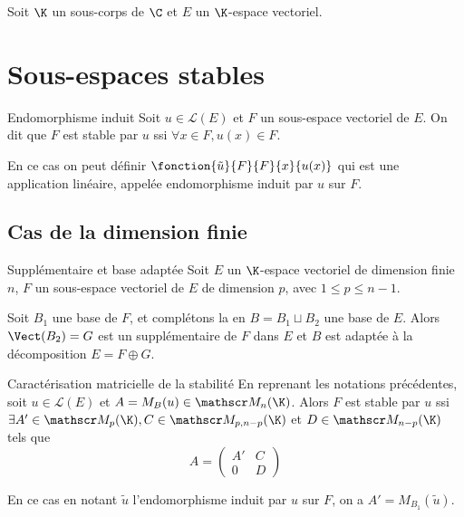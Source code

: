 Soit $\K$ un sous-corps de $\C$ et $E$ un $\K$-espace vectoriel.
 
\section{Sous-espaces stables}

\begin{definition}{Endomorphisme induit}{}
    Soit $u \in \mathscr L(E)$ et $F$ un sous-espace vectoriel de $E$. On dit que 
    $F$ est stable par $u$ ssi $\forall x \in F, u(x) \in F$.

    En ce cas on peut définir $\fonction{\tilde u}{F}{F}{x}{u(x)}$ qui est une application 
    linéaire, appelée endomorphisme induit par $u$ sur $F$.
\end{definition}

\subsection{Cas de la dimension finie}

\begin{proposition}{Supplémentaire et base adaptée}{}
    Soit $E$ un $\K$-espace vectoriel de dimension finie $n$, $F$ un sous-espace vectoriel de $E$
    de dimension $p$, avec $1 \leqslant p \leqslant n - 1$. 

    Soit $B_1$ une base de $F$, et complétons la en $B = B_1 \sqcup B_2$ une base de $E$. Alors 
    $\Vect (B_2) = G$ est un supplémentaire de $F$ dans $E$ et 
    $B$ est adaptée à la décomposition $E = F \oplus G$.

\end{proposition}

\begin{proposition}{Caractérisation matricielle de la stabilité}{}
    En reprenant les notations précédentes, soit $u \in \mathscr L(E)$ et $A = M_B(u) \in \mathscr M_n(\K)$. 
    Alors $F$ est stable par $u$ ssi 
    $\exists A' \in \mathscr M_{p}(\K), C \in \mathscr M_{p, n - p}(\K)$ et $D \in \mathscr M_{n - p}(\K)$ tels que
    \[
        A = \begin{pmatrix}
            A' & C \\
            0 & D
        \end{pmatrix}
    \]

    En ce cas en notant $\tilde u$ l'endomorphisme induit par $u$ sur $F$, on a $A' = M_{B_1}(\tilde u)$.
\end{proposition}

